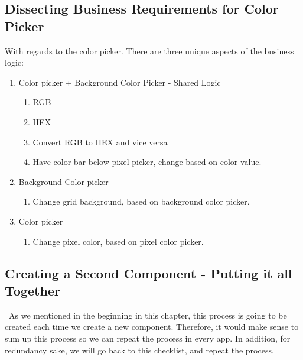 \subsection{ Dissecting Business Requirements for Color Picker }
With regards to the color picker. There are three unique aspects of the business
logic:
\begin{enumerate}
  \item Color picker + Background Color Picker - Shared Logic
    \begin{enumerate}
      \item RGB
      \item HEX
      \item Convert RGB to HEX and vice versa
      \item Have color bar below pixel picker, change based on color value.
    \end{enumerate}
  \item Background Color picker
    \begin{enumerate}
      \item Change grid background, based on background color picker.
    \end{enumerate}
  \item Color picker
    \begin{enumerate}
      \item Change pixel color, based on pixel color picker.
    \end{enumerate}
\end{enumerate}

\subsection{ Creating a Second Component - Putting it all Together }\
As we mentioned in the beginning in this chapter, this process is going to
be created each time we create a new component. Therefore, it would make sense
to sum up this process so we can repeat the process in every app. In addition,
for redundancy sake, we will go back to this checklist, and repeat the process.  

